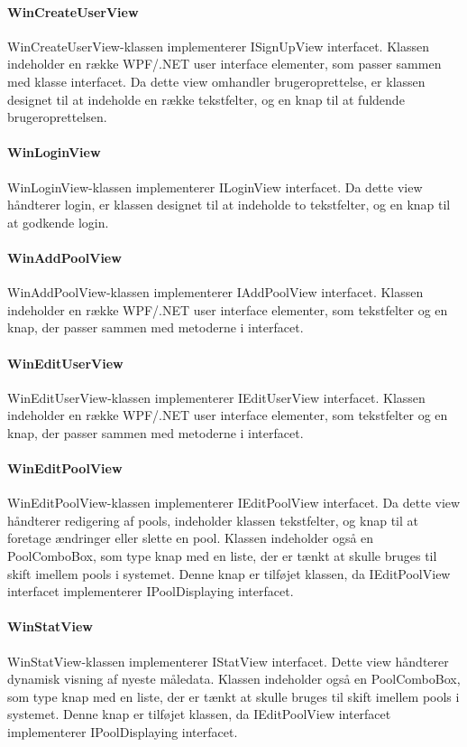 \paragraph {WinCreateUserView}
WinCreateUserView-klassen implementerer ISignUpView interfacet. Klassen indeholder en række WPF/.NET user interface elementer, som passer sammen med klasse interfacet. Da dette view omhandler brugeroprettelse, er klassen designet til at indeholde en række tekstfelter, og en knap til at fuldende brugeroprettelsen. 

\paragraph {WinLoginView}
WinLoginView-klassen implementerer ILoginView interfacet. Da dette view håndterer login, er klassen designet til at indeholde to tekstfelter, og en knap til at godkende login.

\paragraph {WinAddPoolView}
WinAddPoolView-klassen implementerer IAddPoolView interfacet. Klassen indeholder en række WPF/.NET user interface elementer, som tekstfelter og en knap, der passer sammen med metoderne i interfacet. 

\paragraph {WinEditUserView}
WinEditUserView-klassen implementerer IEditUserView interfacet. Klassen indeholder en række WPF/.NET user interface elementer, som tekstfelter og en knap, der passer sammen med metoderne i interfacet.

\paragraph {WinEditPoolView}
WinEditPoolView-klassen implementerer IEditPoolView interfacet. Da dette view håndterer redigering af pools, indeholder klassen tekstfelter, og knap til at foretage ændringer eller slette en pool. 
Klassen indeholder også en PoolComboBox, som type knap med en liste, der er tænkt at skulle bruges til skift imellem pools i systemet. Denne knap er tilføjet klassen, da IEditPoolView interfacet implementerer IPoolDisplaying interfacet.

\paragraph {WinStatView}
WinStatView-klassen implementerer IStatView interfacet. Dette view håndterer dynamisk visning af nyeste måledata.
Klassen indeholder også en PoolComboBox, som type knap med en liste, der er tænkt at skulle bruges til skift imellem pools i systemet. Denne knap er tilføjet klassen, da IEditPoolView interfacet implementerer IPoolDisplaying interfacet.

